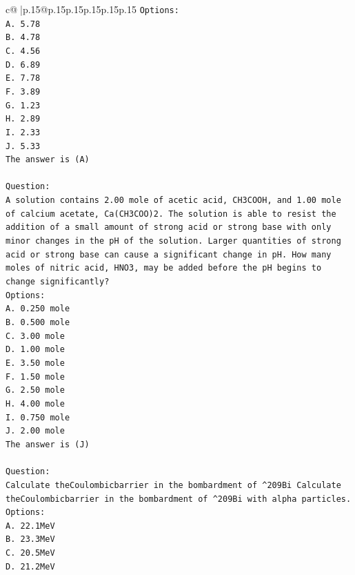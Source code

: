 \documentclass{article}
\begin{document}
{\begin{supertabular}{c@{$\;$}|p{.15\linewidth}@{}p{.15\linewidth}p{.15\linewidth}p{.15\linewidth}p{.15\linewidth}p{.15\linewidth}}
{{{\texttt{Options:} \\
\texttt{A. 5.78} \\
\texttt{B. 4.78} \\
\texttt{C. 4.56} \\
\texttt{D. 6.89} \\
\texttt{E. 7.78} \\
\texttt{F. 3.89} \\
\texttt{G. 1.23} \\
\texttt{H. 2.89} \\
\texttt{I. 2.33} \\
\texttt{J. 5.33} \\
\texttt{The answer is (A)} \\
\\ 
\texttt{Question:} \\
\texttt{A solution contains 2.00 mole of acetic acid, CH3COOH, and 1.00 mole of calcium acetate, Ca(CH3COO)2. The solution is able to resist the addition of a small amount of strong acid or strong base with only minor changes in the pH of the solution. Larger quantities of strong acid or strong base can cause a significant change in pH. How many moles of nitric acid, HNO3, may be added before the pH begins to change significantly?} \\
\texttt{Options:} \\
\texttt{A. 0.250 mole} \\
\texttt{B. 0.500 mole} \\
\texttt{C. 3.00 mole} \\
\texttt{D. 1.00 mole} \\
\texttt{E. 3.50 mole} \\
\texttt{F. 1.50 mole} \\
\texttt{G. 2.50 mole} \\
\texttt{H. 4.00 mole} \\
\texttt{I. 0.750 mole} \\
\texttt{J. 2.00 mole} \\
\texttt{The answer is (J)} \\
\\ 
\texttt{Question:} \\
\texttt{Calculate theCoulombicbarrier in the bombardment of \^{}209Bi Calculate theCoulombicbarrier in the bombardment of \^{}209Bi with alpha particles.} \\
\texttt{Options:} \\
\texttt{A. 22.1MeV} \\
\texttt{B. 23.3MeV} \\
\texttt{C. 20.5MeV} \\
\texttt{D. 21.2MeV} \\
            }
        }
    }
     \\ \\


\end{supertabular}}
\end{document}
